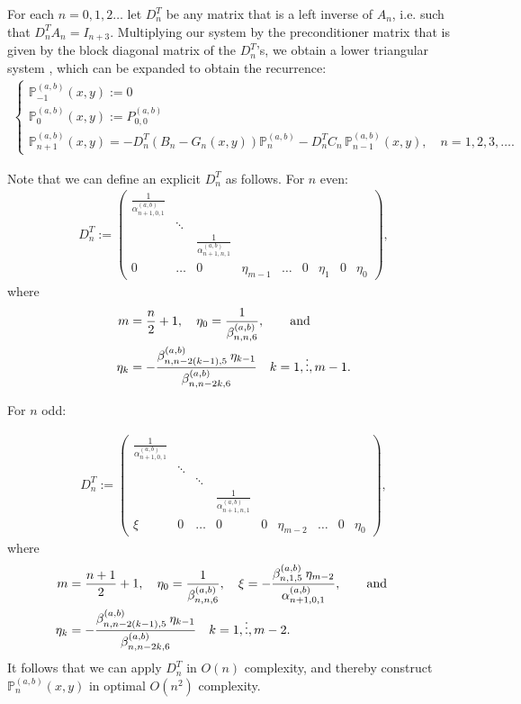 \documentclass[11pt, oneside]{article}   	%
\newcommand{\bigP}{\mathbb{P}}
\newcommand{\alphaab}{\alpha^{(a,b)}}
\newcommand{\betaab}{\beta^{(a,b)}}
\newcommand{\bigPab}{\bigP^{(a,b)}}
\newcommand{\Dnt}{D^T_n}
\begin{document}
For each $n = 0,1,2\dots$ let $\Dnt$ be any matrix that is a left inverse of $A_n$, i.e. such that $\Dnt A_n = I_{n+3}$. Multiplying our system by the preconditioner matrix that is given by the block diagonal matrix of the $\Dnt$'s, we obtain a lower triangular system \cite[p78]{dunkl2014orthogonal}, which can be expanded to obtain the recurrence:
\begin{align}
\begin{cases}
\bigPab_{-1}(x,y) := 0 \\
\bigPab_{0}(x,y) := P^{(a,b)}_{0,0} \\
\bigPab_{n+1}(x,y) = -\Dnt (B_n-G_n(x,y)) \bigPab_n - \Dnt C_n  \,\bigPab_{n-1}(x,y), \quad n = 1,2,3,\dots.
\end{cases}
\end{align}

Note that we can define an explicit \(\Dnt\) as follows. For \(n\) even:
\begin{align}
\Dnt := \begin{pmatrix}
		\frac{1}{\alphaab_{n+1,0,1}} & & &  \\
		& \ddots & & & \\
		& & \frac{1}{\alphaab_{n+1,n,1}} & \\
		0 & \hdots & 0 & \eta_{m-1} & \hdots & 0 & \eta_1 & 0 & \eta_0
	    \end{pmatrix},
\end{align}
where
\begin{align}
m &= \frac{n}{2} + 1, \quad \eta_0 = \frac{1}{\betaab_{n,n,6}},\qqand \nonumber \\
\eta_k &= -\frac{\betaab_{n,n-2(k-1),5} \: \eta_{k-1}}{\betaab_{n,n-2k,6}} \quad k = 1,\dots,m-1.
\end{align}

For \(n\) odd:

\begin{align}
\Dnt := \begin{pmatrix}
		\frac{1}{\alphaab_{n+1,0,1}} & &  \\
		& \ddots & & &  \\
		& & \ddots & & \\
		& & & \frac{1}{\alphaab_{n+1,n,1}} & \\
		\xi & 0 & \hdots & 0 & 0 & \eta_{m-2} & \hdots & 0 & \eta_0
	    \end{pmatrix},
\end{align}
 where
\begin{align}
m &= \frac{n+1}{2} + 1,\quad  \eta_0 = \frac{1}{\betaab_{n,n,6}}, \quad \xi = -\frac{\betaab_{n,1,5} \: \eta_{m-2}}{\alphaab_{n+1,0,1}},\qqand \nonumber \\
\eta_k &= -\frac{\betaab_{n,n-2(k-1),5} \: \eta_{k-1}}{\betaab_{n,n-2k,6}} \quad k = 1,\dots,m-2.
\end{align}
It follows that we can apply $D_n^T$ in $O(n)$ complexity, and thereby construct $\bigPab_{n}(x,y)$ in optimal $O(n^2)$ complexity.
\end{document}
